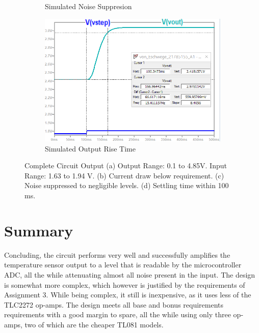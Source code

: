 \begin{figure}[h]
\begin{subfigure}[]{0.45\textwidth}
		    \caption{Simulated Noise Suppresion} \label{subfig:noise}
     \end{subfigure}
    \begin{subfigure}[]{0.45\textwidth}
              \centering
              \vspace{0.5cm}
  		\includegraphics[width=1\linewidth]{./Figures/ts}
		    \caption{Simulated Output Rise Time} \label{subfig:ts}
     \end{subfigure}
   \caption[\textcolor{red}{Complete Circuit Output}]{Complete Circuit Output (a) Output Range: 0.1 to 4.85V. Input Range: 1.63 to 1.94 V. (b)  Current draw below requirement.  (c)  Noise suppressed to negligible levels. (d) Settling time within 100 ms.}
    \label{fig:simulation_results_box}
 \end{figure}

\section{Summary}\label{sec:temp_summary}
Concluding, the circuit performs very well and successfully amplifies the temperature sensor output to a level that is readable by the microcontroller ADC, all the while attenuating almost all noise present in the input. The design is somewhat more complex, which however is justified by the requirements of Assignment 3. While being complex, it still is inexpensive, as it uses less of the TLC2272 op-amps. The design meets all base and bonus requirements requirements with a good margin to spare, all the while using only three op-amps, two of which are the cheaper TL081 models.


